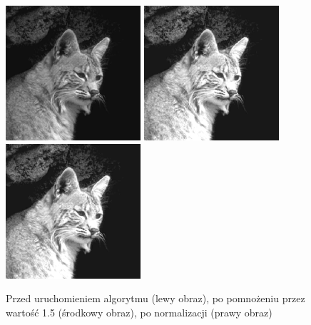 \documentclass[a4paper,12pt]{book}
\begin{document}
\begin{figure}[H]
	\caption{Przed uruchomieniem algorytmu (lewy obraz), po pomnożeniu przez wartość 1.5 (środkowy obraz), po normalizacji (prawy obraz)}
	\includegraphics[width=5cm, height=5cm]{cat-unmodified.jpg}
	\includegraphics[width=5cm, height=5cm]{2-2/multiply-gray-const-cat-15.png}
	\includegraphics[width=5cm, height=5cm]{2-2/multiply-gray-const-cat-15-norm.png}
\end{figure}
\end{document}
